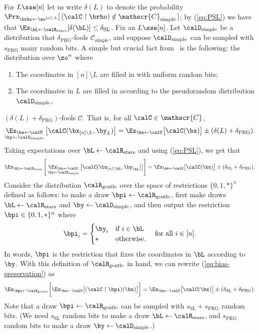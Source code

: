 \documentclass[11pt]{article}
\numberwithin{equation}{section}
\theoremstyle{definition}
\theoremstyle{plain}
\theoremstyle{plain}
\newcommand{\uhr}{\upharpoonright}
\newcommand{\simple}{\mathrm{simple}}
\newcommand{\stars}{\mathrm{stars}}
\newcommand{\gentle}{\mathrm{gentle}}
\newcommand{\PRG}{\mathrm{PRG}}
\newcommand{\SL}{\mathrm{SL}}
\begin{document}
For $L \sse [n]$ let us write $\delta(L)$ to denote the probability $\Prx_{\brho\leftarrow\zo^{[n]\setminus L}}[\, (\calC \uhr \brho) \notin \mathscr{C}_\simple\,]$; by (\ref{eq:PSL}) we have that $\Ex_{\bL\leftarrow\calR_\stars}[\delta(\bL)] \le \delta_\SL$. Fix an $L \sse [n]$. Let $\calD_\simple$ be a distribution that $\delta_\PRG$-fools $\mathscr{C}_\simple$, and suppose $\calD_\simple$ can be sampled with $s_\PRG$ many random bits. A simple but crucial fact from~\cite{AjtaiWigderson:85} is the following: the distribution over $\zo^n$ where 
\begin{enumerate}
\item The coordinates in $[n] \setminus L$ are filled in with uniform random bits;
\item The coordinates in $L$ are filled in according to the pseudorandom distribution $\calD_\simple$,
\end{enumerate}
$(\delta(L) + \delta_\PRG)$-fools $\mathscr{C}$. That is, for all $\calC \in \mathscr{C}$, 
\[ \mathop{\Ex_{\bx\leftarrow\calU}}_{\by\leftarrow\calD_\simple}\big[ \calC(\bx_{[n]\setminus L}, \by_L)\big] = \Ex_{\bx\leftarrow\calU}\big[\calC(\bx)\big] \pm (\delta(L) + \delta_\PRG). \] 
Taking expectations over $\bL \leftarrow\calR_\stars$ and using (\ref{eq:PSL}), we get that 
\begin{equation} \Ex_{\bL\leftarrow\calR_\stars}\left[\,\mathop{\Ex_{\bx\leftarrow\calU}}_{\by\leftarrow\calD_\simple}\big[ \calC(\bx_{[n]\setminus \bL}, \by_{\bL})\big]\right] = \Ex_{\bx\leftarrow\calU}\big[\calC(\bx)\big] \pm (\delta_\SL + \delta_\PRG). \label{eq:bias-preservation}
\end{equation} 
Consider the distribution $\calR_\gentle$ over the space of restrictions $\{0,1,\ast\}^n$ defined as follows: to make a draw $\bpi \leftarrow\calR_\gentle$, first make draws $\bL \leftarrow\calR_\stars$ and $\by \leftarrow\calD_\simple$, and then output the restriction $\bpi \in \{0,1,\ast\}^n$ where 
\[ 
\bpi_i = \begin{cases}
\by_i & \text{if $i \in \bL$} \\
\ast & \text{otherwise.}  
\end{cases} \quad \text{for all $i\in [n]$.}
\] 
In words, $\bpi$ is the restriction that fixes the coordinates in $\bL$ according to $\by$. With this definition of $\calR_\gentle$ in hand, we can rewrite (\ref{eq:bias-preservation}) as 
\begin{equation}
\Ex_{\bpi\leftarrow\calR_\gentle} \bigg[ \Ex_{\bx\leftarrow\calU}\big[(\calC\uhr\bpi)(\bx)\big]\bigg] =  \Ex_{\bx\leftarrow\calU}\big[\calC(\bx)\big] \pm (\delta_\SL + \delta_\PRG). 
\label{eq:bias-preservation2} 
\end{equation}
Note that a draw $\bpi \leftarrow \calR_\gentle$ can be sampled with $s_\SL + s_\PRG$ random bits. (We need $s_\SL$ random bits to make a draw $\bL \leftarrow \calR_\stars$, and $s_\PRG$ random bits to make a draw $\by\leftarrow\calD_\simple$.)
\end{document}
